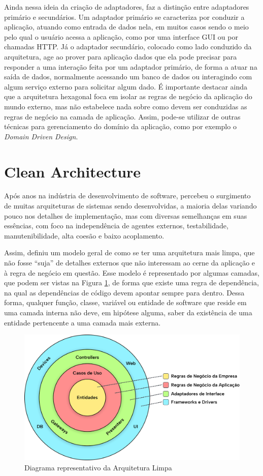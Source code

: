 \documentclass[12pt, %
openright, 
oneside, %
a4paper,    %
brazil]{facom-ufu-abntex2}
\begin{document}
Ainda nessa ideia da criação de adaptadores,  faz a distinção entre adaptadores primário e secundários. Um adaptador primário se caracteriza por conduzir a aplicação, atuando como entrada de dados nela, em muitos casos sendo o meio pelo qual o usuário acessa a aplicação, como por uma interface GUI ou por chamadas HTTP. Já o adaptador secundário, colocado como lado conduzido da arquitetura, age ao prover para aplicação dados que ela pode precisar para responder a uma interação feita por um adaptador primário, de forma a atuar na saída de dados, normalmente acessando um banco de dados ou interagindo com algum serviço externo para solicitar algum dado. É importante destacar ainda que a arquitetura hexagonal foca em isolar as regras de negócio da aplicação do mundo externo, mas não estabelece nada sobre como devem ser conduzidas as regras de negócio na camada de aplicação. Assim, pode-se utilizar de outras técnicas para gerenciamento do domínio da aplicação, como por exemplo o \textit{Domain Driven Design}.

\section{Clean Architecture}
Após anos na indústria de desenvolvimento de software,  percebeu o surgimento de muitas arquiteturas de sistemas sendo desenvolvidas, a maioria delas variando pouco nos detalhes de implementação, mas com diversas semelhanças em suas essências, com foco na independência de agentes externos, testabilidade, manutenibilidade, alta coesão e baixo acoplamento.

Assim,  definiu um modelo geral de como se ter uma arquitetura mais limpa, que não fosse ``suja'' de detalhes externos que não interessam ao cerne da aplicação e à regra de negócio em questão. Esse modelo é representado por algumas camadas, que podem ser vistas na Figura \ref{fig:clean_arch_diagram}, de forma que existe uma regra de dependência, na qual as dependências de código devem apontar sempre para dentro. Dessa forma, qualquer função, classe, variável ou entidade de software que reside em uma camada interna não deve, em hipótese alguma, saber da existência de uma entidade pertencente a uma camada mais externa.

\begin{figure}[ht]
    \centering
    \includegraphics[width=.6\textwidth]{figures/bibliographical_review/clean_arch_diagram.png}
    \caption{Diagrama representativo da Arquitetura Limpa}
    \label{fig:clean_arch_diagram}
\end{figure}
\end{document}
